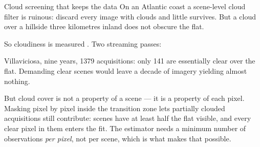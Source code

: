 \begin{pblock}{Cloud screening that keeps the data}
On an Atlantic coast a scene-level cloud filter is ruinous: discard every
image with clouds and little survives. But a cloud over a hillside three
kilometres inland does not obscure the flat.

So cloudiness is measured . Two streaming passes:


Villaviciosa, nine years, 1379 acquisitions: only 141 are
essentially clear over the flat. Demanding clear scenes would leave a decade
of imagery yielding almost nothing.

\vspace{2mm}
But cloud cover is not a property of a scene — it is a property of each pixel.
Masking pixel by pixel inside the transition zone lets partially clouded
acquisitions still contribute:  scenes have at least half
the flat visible, and every clear pixel in them enters the fit. The estimator
needs a minimum number of observations \emph{per pixel}, not per scene, which
is what makes that possible.
\end{pblock}
